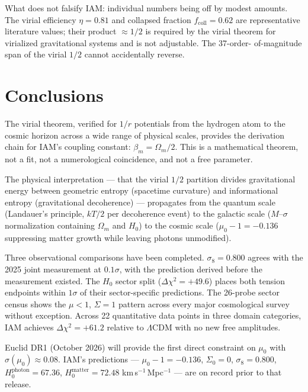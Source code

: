 \documentclass[12pt,a4paper]{article}
\begin{document}
What does not falsify IAM: individual numbers being off by modest amounts. The
virial efficiency $\eta = 0.81$ and collapsed fraction $f_\mathrm{coll} = 0.62$
are representative literature values; their product $\approx 1/2$ is required by the
virial theorem for virialized gravitational systems and is not adjustable. The 37-order-
of-magnitude span of the virial $1/2$ cannot accidentally reverse.

\section{Conclusions}
\label{sec:conclusions}

The virial theorem, verified for $1/r$ potentials from the hydrogen atom to the cosmic
horizon across a wide range of physical scales, provides the derivation chain for IAM's coupling
constant: $\beta_m = \Omega_m/2$. This is a mathematical theorem, not a fit, not a
numerological coincidence, and not a free parameter.

The physical interpretation --- that the virial $1/2$ partition divides gravitational
energy between geometric entropy (spacetime curvature) and informational entropy
(gravitational decoherence) --- propagates from the quantum scale (Landauer's principle,
$kT/2$ per decoherence event) to the galactic scale ($M$--$\sigma$ normalization
containing $\Omega_m$ and $H_0$) to the cosmic scale ($\mu_0 - 1 = -0.136$ suppressing
matter growth while leaving photons unmodified).

Three observational comparisons have been completed. $\sigma_8 = 0.800$ agrees with the
2025 joint measurement at $0.1\sigma$, with the prediction derived before the
measurement existed. The $H_0$ sector split ($\Delta\chi^2 = +49.6$) places both
tension endpoints within $1\sigma$ of their sector-specific predictions. The 26-probe
sector census shows the $\mu < 1$, $\Sigma = 1$ pattern across every major cosmological
survey without exception. Across 22 quantitative data points in three domain categories,
IAM achieves $\Delta\chi^2 = +61.2$ relative to $\Lambda$CDM with no new free
amplitudes.

Euclid DR1 (October 2026) will provide the first direct constraint on $\mu_0$ with
$\sigma(\mu_0) \approx 0.08$. IAM's predictions --- $\mu_0 - 1 = -0.136$, $\Sigma_0 = 0$,
$\sigma_8 = 0.800$, $H_0^{\mathrm{photon}} = 67.36$, $H_0^{\mathrm{matter}} = 72.48$
km\,s$^{-1}$\,Mpc$^{-1}$ --- are on record prior to that release.
\end{document}
